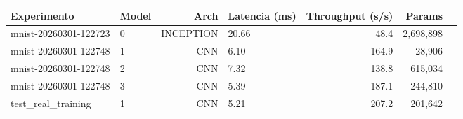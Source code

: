 \begin{tabular}{llrlrrr}
\toprule
Experimento & Model & Arch & Latencia (ms) & Throughput (s/s) & Params \\
\midrule
mnist-20260301-122723 & 0 & INCEPTION & 20.66 & 48.4 & 2,698,898 \\
mnist-20260301-122748 & 1 & CNN & 6.10 & 164.9 & 28,906 \\
mnist-20260301-122748 & 2 & CNN & 7.32 & 138.8 & 615,034 \\
mnist-20260301-122748 & 3 & CNN & 5.39 & 187.1 & 244,810 \\
test_real_training & 1 & CNN & 5.21 & 207.2 & 201,642 \\
\bottomrule
\end{tabular}